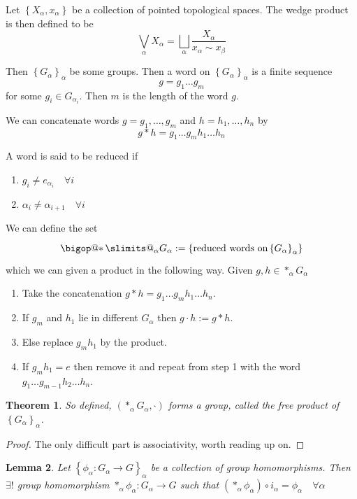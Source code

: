 \documentclass[11pt]{article}
\makeatletter
\newcommand{\defeq}{:=}
\DeclareRobustCommand\bigop[1]{%
  \mathop{\vphantom{\sum}\mathpalette\bigop@{#1}}\slimits@
}
\newcommand{\bigop@}[2]{%
  \vcenter{%
    \sbox\z@{$#1\sum$}%
    \hbox{\resizebox{\ifx#1\displaystyle.9\fi\dimexpr\ht\z@+\dp\z@}{!}{$\m@th#2$}}%
  }%
}
\newcommand{\bigast}{\DOTSB\bigop{\ast}}
\newenvironment{defin}
	{\begin{mdframed}[backgroundcolor=white, roundcorner=5pt, linewidth=1pt]}
	{\end{mdframed}}
\newcommand{\mdf}[1]{{\color{red} #1}}
\newtheorem{theorem}{Theorem}[section]
\newtheorem{lemma}[theorem]{Lemma}
\makeatother
\begin{document}
\begin{defin}
	Let $\left\{X_\alpha, x_\alpha\right\}$ be a collection of pointed topological spaces.
	The \mdf{wedge product} is then defined to be
	\[
\bigvee_\alpha X_\alpha=\bigsqcup_\alpha \frac{X_\alpha}{x_\alpha\sim x_\beta}
	\]

	Then $\left\{G_\alpha\right\}_\alpha$ be some groups.
	Then a \mdf{word} on $\left\{G_\alpha\right\}_\alpha$ is a finite sequence
	\[
g = g_1 \dots g_m 
	\]
	for some $g_i \in G_{\alpha_i}$.
	Then $m$ is the \mdf{length} of the word $g$.

	We can concatenate words $g=g_1, \dots, g_m$ and $h=h_1, \dots, h_n$ by
	\[
		g\ast h = g_1\dots g_m h_1 \dots h_n
	\]

	A word is said to be \mdf{reduced} if
	\begin{enumerate}[label=(\alph*)]
		\item $g_i\neq e_{\alpha_i}\quad\forall i$
		\item $\alpha_i\neq\alpha_{i+1}\quad\forall i$
	\end{enumerate}

	We can define the set
	\[
		\bigast_\alpha G_\alpha \defeq\left\{\text{reduced words on} \left\{G_\alpha\right\}_\alpha\right\}
	\]
	which we can given a product in the following way.
	Given $g,h\in\ast_\alpha G_\alpha$
	\begin{enumerate}
		\item Take the concatenation $g\ast h=g_1\dots g_m h_1 \dots h_n$.
		\item If $g_m$ and $h_1$ lie in different $G_\alpha$ then $g\cdot h \defeq g\ast h$.
		\item Else replace $g_m h_1$ by the product.
		\item If $g_m h_1=e$ then remove it and repeat from step 1 with the word $g_1\dots g_{m-1} h_2 \dots h_n$.
	\end{enumerate}
\end{defin}

\begin{theorem}
So defined, $(\ast_\alpha G_\alpha, \cdot)$ forms a group, called the \mdf{free product} of $\left\{G_\alpha\right\}_\alpha$.
\end{theorem}

\begin{proof}
The only difficult part is associativity, worth reading up on.
\end{proof}

\begin{lemma}
Let $\left\{\phi_\alpha: G_\alpha\to G \right\}_\alpha$ be a collection of group homomorphisms.
Then $\exists !$ group homomorphism $\ast_\alpha \phi_\alpha: G_\alpha \to G$ such that $\left(\ast_\alpha\phi_\alpha\right)\circ i_\alpha = \phi_\alpha \quad \forall \alpha$
\end{lemma}
\end{document}
